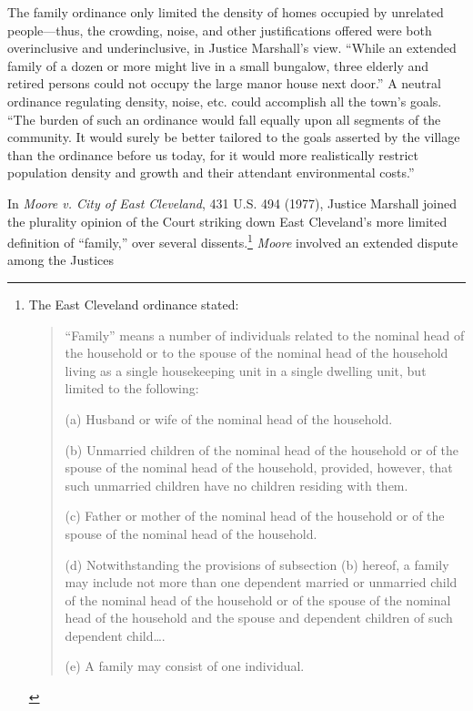 The family ordinance only limited the density of homes occupied by unrelated
people---thus, the crowding, noise, and other justifications offered were both
overinclusive and underinclusive, in Justice Marshall's view. ``While an
extended family of a dozen or more might live in a small bungalow, three elderly
and retired persons could not occupy the large manor house next door.'' A
neutral ordinance regulating density, noise, etc. could accomplish all the
town's goals. ``The burden of such an ordinance would fall equally upon all
segments of the community. It would surely be better tailored to the goals
asserted by the village than the ordinance before us today, for it would more
realistically restrict population density and growth and their attendant
environmental costs.'' 

\item
In \textit{Moore v. City of East Cleveland}, 431 U.S. 494 (1977), Justice
Marshall joined the plurality opinion of the Court striking down East
Cleveland's more limited definition of ``family,'' over several
dissents.\footnote{The East Cleveland ordinance stated:

\begin{quote}
``Family'' means a
number of individuals related to the nominal head of the household or to the
spouse of the nominal head of the household living as a single housekeeping unit
in a single dwelling unit, but limited to the following:
\begin{statute}
\item (a) Husband or wife
of the nominal head of the household.

\item (b) Unmarried children of the nominal
head of the household or of the spouse of the nominal head of the household,
provided, however, that such unmarried children have no children residing with
them.

\item (c) Father or mother of the nominal head of the household or of the
spouse of the nominal head of the household.

\item (d) Notwithstanding the
provisions of subsection (b) hereof, a family may include not more than one
dependent married or unmarried child of the nominal head of the household or of
the spouse of the nominal head of the household and the spouse and dependent
children of such dependent child\ldots.

\item (e) A family may consist of one
individual.
\end{statute}
\end{quote}
} \textit{Moore} involved an extended dispute among the Justices
